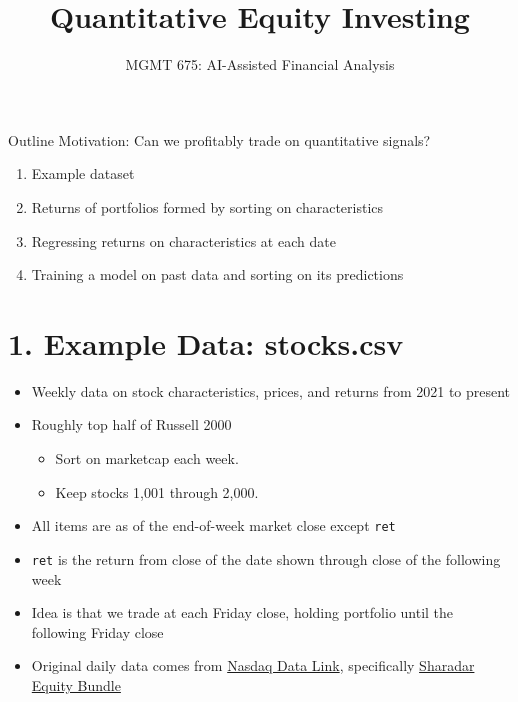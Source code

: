 \documentclass[10pt]{beamer}
\title{Quantitative Equity Investing}
\subtitle{MGMT 675: AI-Assisted Financial Analysis}
\date{}
\begin{document}
\begin{frame}[plain]
\titlepage
\end{frame}

\begin{frame}{Outline}
    Motivation: Can we profitably trade on quantitative signals?
    \vspace{1em}
    \begin{enumerate}
    \item Example dataset
    \item Returns of portfolios formed by sorting on characteristics
     \item Regressing returns on characteristics at each date
\item Training a model on past data and sorting on its predictions
    \end{enumerate}
\end{frame}

\section{1. Example Data: stocks.csv}

\begin{frame}[fragile]
\begin{itemize}
    \item Weekly data on stock characteristics, prices, and returns from 2021 to present
    \item Roughly top half of Russell 2000
    \begin{itemize}
    \item Sort on marketcap each week.  
    \item Keep stocks 1,001 through 2,000.  
    \end{itemize}
    \item All items are as of the end-of-week market close except \verb!ret!
    \item \verb!ret! is the return from close of the date shown through close of the following week
    \item Idea is that we trade at each Friday close, holding portfolio until the following Friday close
    \item Original daily data comes from \href{https://www.nasdaq.com/solutions/data/nasdaq-data-link}{Nasdaq Data Link}, specifically \href{https://data.nasdaq.com/databases/SFA}{Sharadar Equity Bundle}
\end{itemize}
\end{frame}
\end{document}
